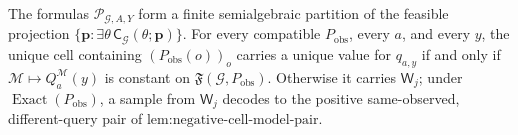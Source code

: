 The formulas \(\mathscr P_{\mathcal G,A,Y}\) form a finite semialgebraic partition of the feasible projection \(\{\mathbf p:\exists\theta\,\mathsf C_{\mathcal G}(\theta;\mathbf p)\}\). For every compatible \(P_{\mathrm{obs}}\), every \(a\), and every \(y\), the unique cell containing \((P_{\mathrm{obs}}(o))_o\) carries a unique value for \(q_{a,y}\) if and only if \(\mathcal M\mapsto Q_a^{\mathcal M}(y)\) is constant on \(\mathfrak F(\mathcal G,P_{\mathrm{obs}})\). Otherwise it carries \(\mathsf W_j\); under \(\operatorname{Exact}(P_{\mathrm{obs}})\), a sample from \(\mathsf W_j\) decodes to the positive same-observed, different-query pair of \(\text{lem:negative-cell-model-pair}\).